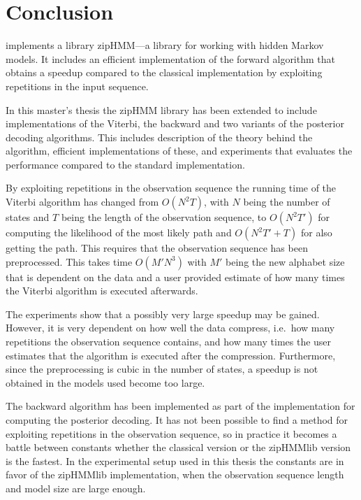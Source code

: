 \chapter{Conclusion}
\label{cha:conclusion}

\citet{sand2013ziphmmlib} implements a library zipHMM---a library for working
with hidden Markov models. It includes an efficient implementation of the forward
algorithm that obtains a speedup compared to the classical implementation by
exploiting repetitions in the input sequence.

In this master's thesis the zipHMM library has been extended to include
implementations of the Viterbi, the backward and two variants of the posterior
decoding algorithms. This includes description of the theory behind the
algorithm, efficient implementations of these, and experiments that evaluates
the performance compared to the standard implementation.

By exploiting repetitions in the observation sequence the running time of the
Viterbi algorithm has changed from $O(N^2 T)$, with $N$ being the number of
states and $T$ being the length of the observation sequence, to $O(N^2 T')$ for
computing the likelihood of the most likely path and $O(N^2 T' + T)$ for also
getting the path. This requires that the observation sequence has been
preprocessed. This takes time $O(M' N^3)$ with $M'$ being the new alphabet size
that is dependent on the data and a user provided estimate of how many times
the Viterbi algorithm is executed afterwards.

The experiments show that a possibly very large speedup may be gained. However,
it is very dependent on how well the data compress, i.e.\ how many repetitions
the observation sequence contains, and how many times the user estimates that the
algorithm is executed after the compression. Furthermore, since the
preprocessing is cubic in the number of states, a speedup is not obtained in
the models used become too large.

The backward algorithm has been implemented as part of the implementation for
computing the posterior decoding. It has not been possible to find a method for
exploiting repetitions in the observation sequence, so in practice it becomes a
battle between constants whether the classical version or the zipHMMlib version
is the fastest. In the experimental setup used in this thesis the constants are
in favor of the zipHMMlib implementation, when the observation sequence length and
model size are large enough.


